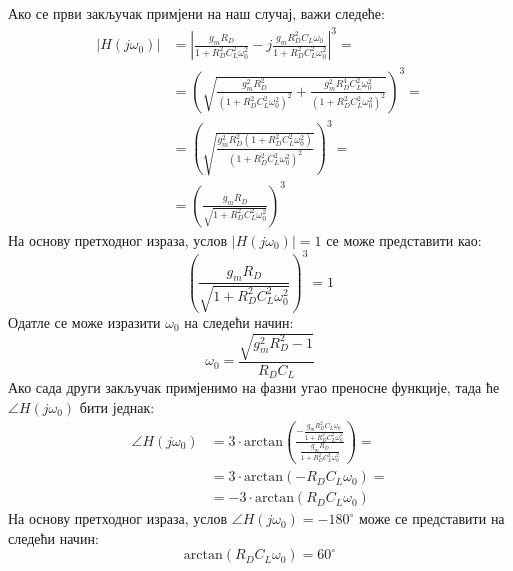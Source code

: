 \documentclass[master]{finthesis}
\begin{document}
Ако се први закључак примјени на наш случај, важи следеће:
\begin{equation} 
	\label{osc_feedback_eq_12}
	\displaystyle
	\begin{split}
		|H(j\omega_{0})| &= \left|\frac{g_{m}R_{D}}{1+R_{D}^{2}C_{L}^{2}\omega_{0}^2}-j\frac{g_{m}R_{D}^{2}C_{L}\omega_{0}}{1+R_{D}^{2}C_{L}^{2}\omega_{0}^{2}}\right|^{3} = \\
				 &= \left(\sqrt{\frac{g_{m}^{2}R_{D}^{2}}{(1+R_{D}^{2}C_{L}^{2}\omega_{0}^{2})^{2}}+\frac{g_{m}^{2}R_{D}^{4}C_{L}^{2}\omega_{0}^{2}}{(1+R_{D}^{2}C_{L}^{2}\omega_{0}^{2})^{2}}}\right)^{3} = \\
				 &= \left(\sqrt{\frac{g_{m}^{2}R_{D}^{2}(1+R_{D}^{2}C_{L}^{2}\omega_{0}^{2})}{(1+R_{D}^{2}C_{L}^{2}\omega_{0}^{2})^{2}}}\right)^{3} = \\
				 &= \left(\frac{g_{m}R_{D}}{\sqrt{1+R_{D}^{2}C_{L}^{2}\omega_{0}^{2}}}\right)^{3}
	\end{split}
\end{equation}
На основу претходног израза, услов $|H(j\omega_{0})|=1$ се може представити као:
\begin{equation}
	\label{osc_feedback_eq_13}
	\displaystyle
	\left(\frac{g_{m}R_{D}}{\sqrt{1+R_{D}^{2}C_{L}^{2}\omega_{0}^{2}}}\right)^{3} = 1
\end{equation}
Одатле се може изразити $\omega_{0}$ на следећи начин:
\begin{equation}
	\label{osc_feedback_eq_14}
	\displaystyle
	\omega_{0} = \frac{\sqrt{g_{m}^{2}R_{D}^{2}-1}}{R_{D}C_{L}}
\end{equation}
Ако сада други закључак примјенимо на фазни угао преносне функције, тада ће $\angle H(j\omega_{0})$ бити једнак:
\begin{equation}
	\label{osc_feedback_eq_15}
	\displaystyle
	\begin{split}
		\angle H(j\omega_{0}) &= 3\cdot\text{arctan}\left(\frac{\displaystyle -\frac{g_{m}R_{D}^{2}C_{L}\omega_{0}}{1+R_{D}^{2}C_{L}^{2}\omega_{0}^2}}{\displaystyle \frac{g_{m}R_{D}}{1+R_{D}^{2}C_{L}^{2}\omega_{0}^2}}\right) = \\
				     &= 3\cdot\text{arctan}(-R_{D}C_{L}\omega_{0}) = \\
				     &= -3\cdot\text{arctan}(R_{D}C_{L}\omega_{0})
	\end{split}
\end{equation}
На основу претходног израза, услов $\angle H(j\omega_{0}) = -180^{\circ}$ може се представити на следећи начин:
\begin{equation}
	\label{osc_feedback_eq_16}
	\displaystyle
	\text{arctan}(R_{D}C_{L}\omega_{0}) = 60^{\circ}
\end{equation}
\end{document}
